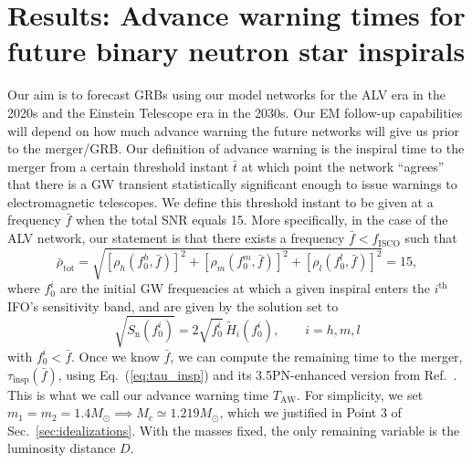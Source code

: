\documentclass[prd,amsmath,amssymb,aps,floats,amsfonts,notitlepage,superscriptaddress,eqsecnum,nofootinbib,10pt]{revtex4-1}
\newcommand{\f}{\frac}
\newcommand{\be}{\begin{equation}}
\newcommand{\ee}{\end{equation}}
\begin{document}
\section{Results: Advance warning times for future binary neutron star inspirals}\label{sec:results}
 Our aim is to forecast GRBs using our model networks for the ALV era in the 2020s
 and the Einstein Telescope era in the 2030s.
 Our EM follow-up capabilities will depend on how much advance warning the future networks will give us prior to the merger/GRB.
 Our definition of advance warning is the inspiral time to the merger from a certain threshold instant $\bar{t}$ at which point the network ``agrees'' that there is a GW transient
 statistically significant enough to issue warnings to electromagnetic telescopes.
 We define this threshold instant to be given at a frequency $\bar{f}$ when the total SNR equals 15. 
 More specifically, in the case of the ALV network, our statement is that there exists a frequency $\bar{f} < f_\text{ISCO}$ such that
 \be
 \bar\rho_\text{tot}= \sqrt{\left[\rho_h(f_0^h,\bar{f})\right]^2+\left[\rho_m(f_0^m,\bar{f})\right]^2+\left[\rho_l(f_0^l,\bar{f})\right]^2}=15, \label{eq:SNR_bar}%
 \ee
 where $f_0^i$ are the initial GW frequencies at which a given inspiral enters the $i^\text{th}$ IFO's sensitivity band, and
 are given by the solution set to
 \be
 \sqrt{S_\text{n}(f_0^i)} = 2\sqrt{f_0^i}\, \tilde{H}_i(f_0^i) \label{eq:f0},\qquad i=h,m,l
 \ee
 with $f_0^i < \bar{f}$.
 Once we know $\bar{f}$, we can compute the remaining time to the merger, $\tau_\text{insp}(\bar{f})$, using Eq.~(\ref{eq:tau_insp})
 and its 3.5PN-enhanced version from Ref.~\cite{Blanchet_LRR}. This is what we call our advance warning time $T_\text{AW}$.
 For simplicity, we set $m_1=m_2=1.4 M_\odot \implies M_c\simeq 1.219 M_\odot$, which we justified in
 Point 3 of Sec.~\ref{sec:idealizations}. 
 With the masses fixed, the only remaining variable is the 
 luminosity distance $D$.
\end{document}

